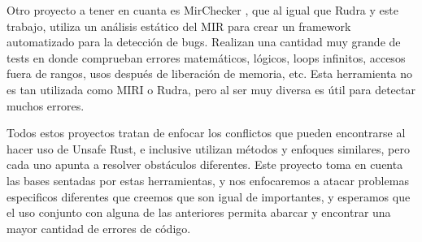 Otro proyecto a tener en cuanta es MirChecker \cite{li2021mirchecker}, que al igual que Rudra y este trabajo, utiliza un análisis estático del MIR para crear un framework automatizado para la detección de bugs. Realizan una cantidad muy grande de tests en donde comprueban errores matemáticos, lógicos, loops infinitos, accesos fuera de rangos, usos después de liberación de memoria, etc. Esta herramienta no es tan utilizada como MIRI o Rudra, pero al ser muy diversa es útil para detectar muchos errores.

Todos estos proyectos tratan de enfocar los conflictos que pueden encontrarse al hacer uso de Unsafe Rust, e inclusive utilizan métodos y enfoques similares, pero cada uno apunta a resolver obstáculos diferentes. Este proyecto toma en cuenta las bases sentadas por estas herramientas, y nos enfocaremos a atacar problemas especificos diferentes que creemos que son igual de importantes, y esperamos que el uso conjunto con alguna de las anteriores permita abarcar y encontrar una mayor cantidad de errores de código.

